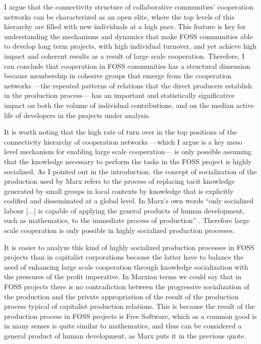 I argue that the connectivity structure of collaborative communities' cooperation networks can be characterized as an open elite, where the top levels of this hierarchy are filled with new individuals at a high pace. This feature is key for understanding the mechanisms and dynamics that make FOSS communities able to develop long term projects, with high individual turnover, and yet achieve high impact and coherent results as a result of large scale cooperation. Therefore, I can conclude that cooperation in FOSS communities has a structural dimension because membership in cohesive groups that emerge from the cooperation networks ---the repeated patterns of relations that the direct producers establish in the production process--- has an important and statistically significative impact on both the volume of individual contributions, and on the median active life of developers in the projects under analysis.

It is worth noting that the high rate of turn over in the top positions of the connectivity hierarchy of cooperation networks ---which I argue is a key meso level mechanism for enabling large scale cooperation--- is only possible assuming that the knowledge necessary to perform the tasks in the FOSS project is highly socialized. As I pointed out in the introduction, the concept of socialization of the production used by Marx refers to the process of replacing tacit knowledge generated by small groups in local contexts by knowledge that is explicitly codified and disseminated at a global level. In Marx's own words ``only socialized labour [...] is capable of applying the general products of human development, such as mathematics, to the immediate process of production'' \citep[1024]{marx:1990}. Therefore large scale cooperation is only possible in highly socialized production processes.

It is easier to analyze this kind of highly socialized production processes in FOSS projects than in capitalist corporations because the latter have to balance the need of enhancing large scale cooperation through knowledge socialization with the pressures of the profit imperative. In Marxian terms we could say that in FOSS projects there is no contradiction between the progressive socialization of the production and the private appropriation of the result of the production process typical of capitalist production relations. This is because the result of the production process in FOSS projects is Free Software, which as a common good is in many senses is quite similar to mathematics, and thus can be considered a general product of human development, as Marx puts it in the previous quote.

